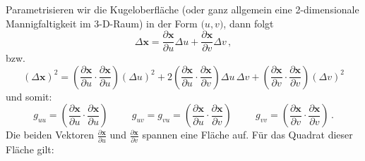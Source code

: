 Parametrisieren wir die Kugeloberfl\"ache (oder ganz allgemein eine 2-dimensionale Mannigfaltigkeit
im 3-D-Raum) in der Form $\pmb(u,v)$, dann folgt
\begin{equation}
       \Delta \pmb{x} = 
       \frac{\partial \pmb{x}}{\partial u} \Delta u + \frac{\partial \pmb{x}}{\partial v} \Delta v \, ,
\end{equation}
bzw.
\begin{equation}
\label{eq_g_uv}
      ( \Delta \pmb{x})^2 = 
       \left( \frac{\partial \pmb{x}}{\partial u} \cdot \frac{\partial \pmb{x}}{\partial u} \right)
       ( \Delta u)^2 + 2 \left( \frac{\partial \pmb{x}}{\partial u} \cdot \frac{\partial \pmb{x}}{\partial v} \right)
       \Delta u \, \Delta v + \left( \frac{\partial \pmb{x}}{\partial v}\cdot \frac{\partial \pmb{x}}{\partial v}\right)
          (\Delta v)^2 
\end{equation}
und somit:
\begin{equation}
       g_{u u} =   \left( \frac{\partial \pmb{x}}{\partial u} \cdot \frac{\partial \pmb{x}}{\partial u} \right)
       \hspace{1cm}
       g_{u v} = g_{v u} =  \left( \frac{\partial \pmb{x}}{\partial u} \cdot \frac{\partial \pmb{x}}{\partial v} \right)
       \hspace{1cm}
       g_{v v} = \left( \frac{\partial \pmb{x}}{\partial v}\cdot \frac{\partial \pmb{x}}{\partial v}\right)  \, .
\end{equation}
Die beiden Vektoren $\frac{\partial \pmb{x}}{\partial u}$ und $\frac{\partial \pmb{x}}{\partial v}$ spannen
eine Fl\"ache auf. F\"ur das Quadrat dieser Fl\"ache gilt:
